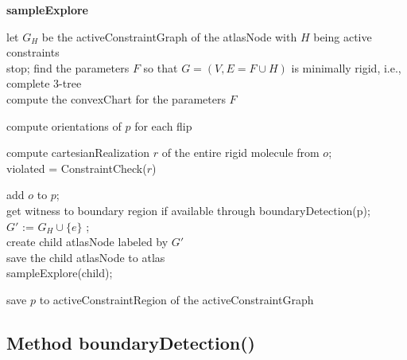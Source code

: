 \begin{algorithm} [htbp]

 {\bf sampleExplore}\\
 \BlankLine

	let $G_H$ be the activeConstraintGraph of the atlasNode with $H$ being active constraints\\
		{stop;	}
	find the parameters $F$ so that $G = (V, E = F\cup H)$ is minimally rigid, i.e., complete 3-tree\\
	compute the convexChart for the parameters $F$\\



	{
		compute orientations of $p$ for each flip\\

		{

			compute cartesianRealization $r$ of the entire rigid molecule from $o$;\\
			violated = ConstraintCheck($r$)
			{

				add $o$ to $p$;\\
				get witness to boundary region if available through boundaryDetection(p);\\
				{
					$G'$ := $G_H \cup \{e\}$ ;\\
					{
						create child atlasNode labeled by $G'$\\
						save the child atlasNode to atlas\\
						sampleExplore(child);\\
					}
				}
			}
		}

		save $p$ to activeConstraintRegion of the activeConstraintGraph\\
	}

	\caption{sampleExplore}
\label{alg:sampleExplore}
\end{algorithm}





\subsection{ Method \textsf{boundaryDetection()}}
\label{sec:boundaryDetection}


